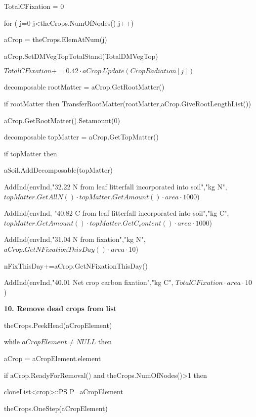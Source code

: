 \documentclass[%
]{scrartcl}
\begin{document}
  TotalCFixation = 0
   
for ( j=0 j<theCrops.NumOfNodes() j++)
   
  \quad     aCrop = theCrops.ElemAtNum(j)
 
  \quad    aCrop.SetDMVegTopTotalStand(TotalDMVegTop)
  
 \quad   $ TotalCFixation += 0.42 \cdot aCrop.Update(CropRadiation[j])$

   \quad    decomposable    rootMatter = aCrop.GetRootMatter()
  
\quad     if rootMatter then 
            	 TransferRootMatter(rootMatter,aCrop.GiveRootLengthList())
  
 \quad       aCrop.GetRootMatter().Setamount(0)
  
      

   \quad    decomposable   topMatter = aCrop.GetTopMatter()
  
 \quad    if topMatter then
      
   \quad         \quad	 aSoil.AddDecomposable(topMatter)

 \quad   	    \quad	 AddInd(envInd,"32.22 N from leaf litterfall incorporated into soil","kg N",
$topMatter.GetAllN() \cdot topMatter.GetAmount() \cdot area \cdot 1000$)
		
 \quad  \quad	   AddInd(envInd,
"40.82 C from leaf litterfall incorporated into soil","kg C",
$topMatter.GetAmount() \cdot topMatter.GetC_content() \cdot area \cdot 1000$)
      
  \quad     AddInd(envInd,"31.04 N from fixation","kg N",
$aCrop.GetNFixationThisDay() \cdot area \cdot 10$)
 
 \quad     nFixThisDay+=aCrop.GetNFixationThisDay()
   

  
AddInd(envInd,"40.01 Net crop carbon fixation","kg C",
$TotalCFixation \cdot area \cdot 10$)

   \textbf{10. Remove dead crops from list}
   
theCrops.PeekHead(aCropElement)
   
while $aCropElement\ne NULL$ then
   
      \quad	  aCrop = aCropElement.element
    
\quad	    if aCrop.ReadyForRemoval()  and  theCrops.NumOfNodes()>1 then
      
       \quad	  \quad	     cloneList<crop>::PS P=aCropElement
        
 \quad	  \quad	   theCrops.OneStep(aCropElement)
       
\end{document}
